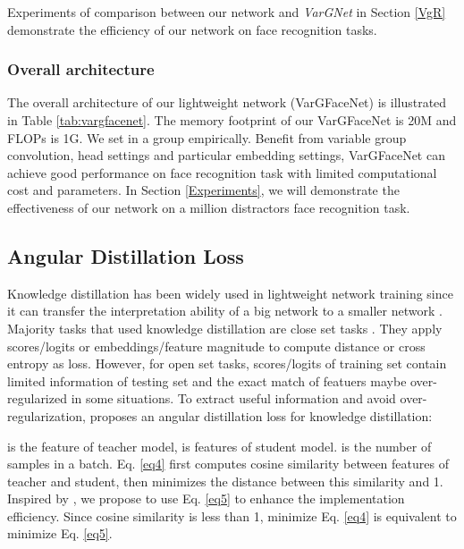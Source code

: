 \documentclass[10pt,twocolumn,letterpaper]{article}
\begin{document}
Experiments of comparison between our network and \textit{VarGNet} in Section \ref{VgR} demonstrate the efficiency of our network on face recognition tasks.

\subsubsection{Overall architecture}
The overall architecture of our lightweight network (VarGFaceNet) is illustrated in Table \ref{tab:vargfacenet}. The memory footprint of our VarGFaceNet is 20M and FLOPs is 1G. We set  in a group empirically.  Benefit from variable group convolution, head settings and particular embedding settings, VarGFaceNet can achieve good performance on face recognition task with limited computational cost and parameters. In Section \ref{Experiments}, we will demonstrate the effectiveness of our network on a million distractors face recognition task.













\subsection{Angular Distillation Loss}
Knowledge distillation has been widely used in lightweight network training since it can transfer the interpretation ability of a big network to a smaller network \cite{mobilenet}. Majority tasks that used knowledge distillation are close set tasks \cite{romero2014fitnets, hinton2015distilling}. They apply scores/logits or embeddings/feature magnitude to compute  distance or cross entropy as loss. However, for open set tasks, scores/logits of training set contain limited information of testing  set and the exact match of featuers maybe over-regularized in some situations. To extract useful information and avoid  over-regularization, \cite{duong2019shrinkteanet} proposes an angular distillation loss for knowledge distillation:


 is the  feature of teacher model,  is  features of student model.  is the number of samples in a batch. Eq. \ref{eq4} first computes cosine similarity between features of teacher and student, then minimizes the  distance between this similarity and 1. Inspired by \cite{duong2019shrinkteanet}, we propose to use Eq. \ref{eq5} to enhance the implementation efficiency. Since cosine similarity is less than 1, minimize Eq. \ref{eq4} is equivalent to minimize Eq. \ref{eq5}.
\end{document}
